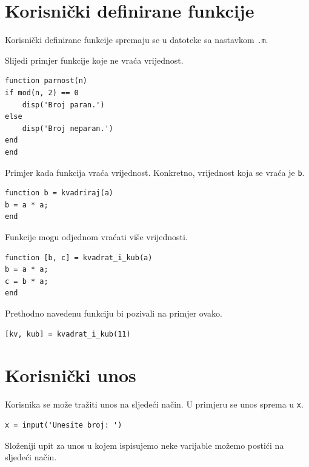 \documentclass[a4paper, 10pt]{article}
\newcommand{\spec}[1]{\texttt{#1}} %
\begin{document}

\section{Korisnički definirane funkcije}

Korisnički definirane funkcije spremaju se u datoteke sa nastavkom \spec{.m}.

Slijedi primjer funkcije koje ne vraća vrijednost.

\begin{lstlisting}
function parnost(n)
if mod(n, 2) == 0
    disp('Broj paran.')
else
    disp('Broj neparan.')
end
end
\end{lstlisting}

Primjer kada funkcija vraća vrijednost.
Konkretno, vrijednost koja se vraća je \spec{b}.

\begin{lstlisting}
function b = kvadriraj(a)
b = a * a;
end
\end{lstlisting}

Funkcije mogu odjednom vraćati više vrijednosti.

\begin{lstlisting}
function [b, c] = kvadrat_i_kub(a)
b = a * a;
c = b * a;
end
\end{lstlisting}

Prethodno navedenu funkciju bi pozivali na primjer ovako.

\begin{lstlisting}
[kv, kub] = kvadrat_i_kub(11)
\end{lstlisting}


\section{Korisnički unos}

Korisnika se može tražiti unos na sljedeći način.
U primjeru se unos sprema u \spec{x}.

\begin{lstlisting}
x = input('Unesite broj: ')
\end{lstlisting}

Složeniji upit za unos u kojem ispisujemo neke varijable možemo postići na sljedeći način.
\end{document}
